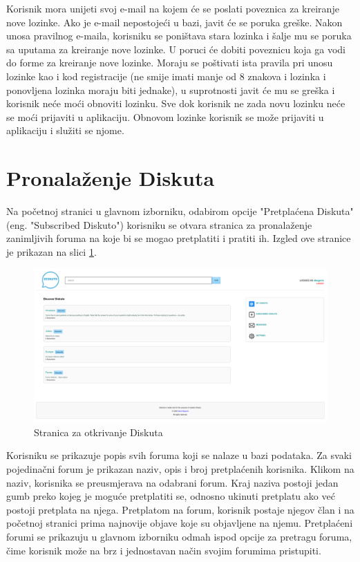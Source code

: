 \documentclass{foi}
\begin{document}
Korisnik mora unijeti svoj e-mail na kojem će se poslati poveznica za kreiranje nove lozinke. Ako je e-mail nepostojeći u bazi, javit će se poruka greške. Nakon unosa pravilnog e-maila, korisniku se poništava stara lozinka i šalje mu se poruka sa uputama za kreiranje nove lozinke. U poruci će dobiti poveznicu koja ga vodi do forme za kreiranje nove lozinke. Moraju se poštivati ista pravila pri unosu lozinke kao i kod registracije (ne smije imati manje od 8 znakova i lozinka i ponovljena lozinka moraju biti jednake), u suprotnosti javit će mu se greška i korisnik neće moći obnoviti lozinku. Sve dok korisnik ne zada novu lozinku neće se moći prijaviti u aplikaciju. Obnovom lozinke korisnik se može prijaviti u aplikaciju i služiti se njome.

\section{Pronalaženje Diskuta}

Na početnoj stranici u glavnom izborniku, odabirom opcije "Pretplaćena Diskuta" (eng. "Subscribed Diskuto") korisniku se otvara stranica za pronalaženje zanimljivih foruma na koje bi se mogao pretplatiti i pratiti ih. Izgled ove stranice je prikazan na slici \ref{otkrij}.

\begin{figure}[h!]
    \centering
    \includegraphics[width=1\textwidth]{slike/otkrij.png}
    \caption{Stranica za otkrivanje Diskuta}
    \label{otkrij}
\end{figure}

Korisniku se prikazuje popis svih foruma koji se nalaze u bazi podataka.  Za svaki pojedinačni forum je prikazan naziv, opis i broj pretplaćenih korisnika. Klikom na naziv, korisnika se preusmjerava na odabrani forum. Kraj naziva postoji jedan gumb preko kojeg je moguće pretplatiti se, odnosno ukinuti pretplatu ako već postoji pretplata na njega. Pretplatom na forum, korisnik postaje njegov član i na početnoj stranici prima najnovije objave koje su objavljene na njemu. Pretplaćeni forumi se prikazuju u glavnom izborniku odmah ispod opcije za pretragu foruma, čime korisnik može na brz i jednostavan način svojim forumima pristupiti.
\end{document}
